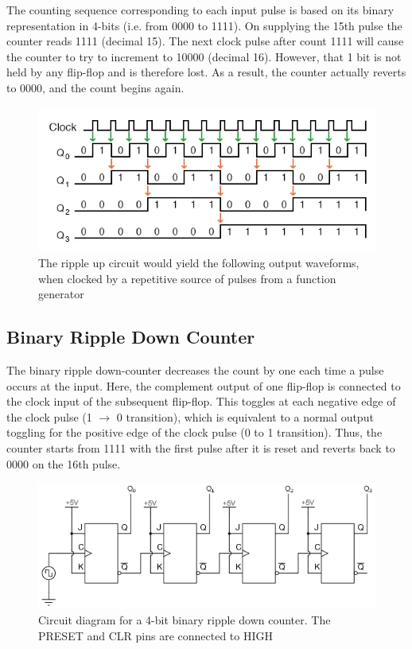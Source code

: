 The counting sequence corresponding to each input pulse is based on its binary representation in 4-bits (i.e. from 0000 to 1111). On supplying the 15th pulse the counter reads 1111 (decimal 15). The next clock
pulse after count 1111 will cause the counter to try to increment to 10000 (decimal 16).
However, that 1 bit is not held by any flip-flop and is therefore lost. As a result, the
counter actually reverts to 0000, and the count begins again.

\begin{figure}[H]
    \centering
    \includegraphics[width=1\columnwidth]{images/upplot.png}
    \caption{The ripple up circuit would yield the following output waveforms, when clocked by a repetitive source of pulses from a function generator}
    \label{upp}
\end{figure}
\subsection{Binary Ripple Down Counter}

The binary ripple down-counter decreases the count by one each time a pulse
occurs at the input. Here, the complement
output of one flip-flop is connected to the clock input of the subsequent flip-flop. This toggles at each negative edge of the clock pulse (1 $\rightarrow$ 0 transition),
which is equivalent to a normal output toggling for the positive edge of the clock pulse (0 to
1 transition). Thus, the counter starts from 1111 with the first pulse after it is reset and reverts
back to 0000 on the 16th pulse.

\begin{figure}[H]
    \centering
    \includegraphics[width=1\columnwidth]{images/down.png}
    \caption{Circuit diagram for a 4-bit binary ripple down counter. The PRESET and CLR pins are connected to HIGH}
    \label{down}
\end{figure}
